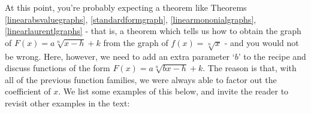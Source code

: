 \documentclass{ximera}
\begin{document}













\begin{center} 
\end{center}

At this point, you're probably expecting a theorem like Theorems \ref{linearabsvaluegraphs}, \ref{standardformgraph}, \ref{linearmononialgraphs},  \ref{linearlaurentlgraphs} - that is, a theorem which tells us how to obtain the graph of $F(x) = a \sqrt[n]{x-h}+k$ from the  graph of $f(x) = \sqrt[n]{x}$ - and you would not be wrong.  Here, however, we need to add an extra parameter `$b$' to the recipe and discuss functions of the form $F(x) = a \sqrt[n]{bx-h}+k$.  The reason is that, with all of the previous function families, we were always able to factor out the coefficient of $x$. We list some examples of this below, and invite the reader to revisit other examples in the text:
\end{document}
